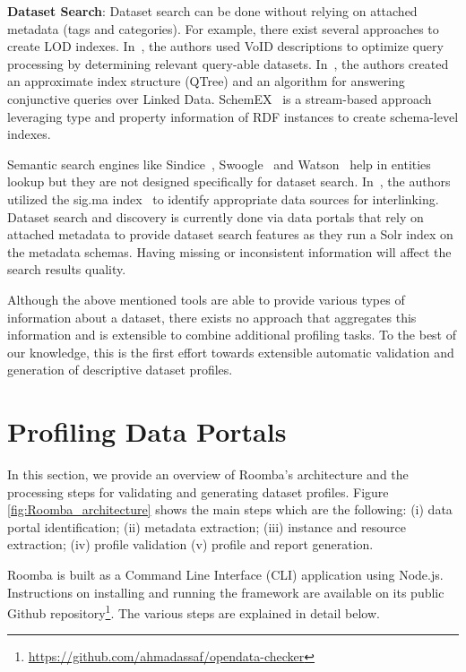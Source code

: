 \documentclass[runningheads,a4paper]{../../Util/LaTEX/llncs}
\begin{document}
\textbf{Dataset Search}: Dataset search can be done without relying on attached metadata (tags and categories). For example, there exist several approaches to create LOD indexes. In~\cite{Alexander:LDOW:09}, the authors used VoID descriptions to optimize query processing by determining relevant query-able datasets. In~\cite{Harth:WWW:10}, the authors created an approximate index structure (QTree) and an algorithm for answering conjunctive queries over Linked Data. SchemEX~\cite{Konrath:WebSemJorunal:12} is a stream-based approach leveraging type and property information of RDF instances to create schema-level indexes.

Semantic search engines like Sindice~\cite{Delbru:ESWC:10}, Swoogle~\cite{Ding:CIKM:04} and Watson~\cite{daquin:SemWebJorunal:11} help in entities lookup but they are not designed specifically for dataset search. In~\cite{Nikolov:JIST:11}, the authors utilized the sig.ma index~\cite{Tummarello:WebSemJorunal:10} to identify appropriate data sources for interlinking. Dataset search and discovery is currently done via data portals that rely on attached metadata to provide dataset search features as they run a Solr index on the metadata schemas. Having missing or inconsistent information will affect the search results quality.

Although the above mentioned tools are able to provide various types of information about a dataset, there exists no approach that aggregates this information and is extensible to combine additional profiling tasks. To the best of our knowledge, this is the first effort towards extensible automatic validation and generation of descriptive dataset profiles.


\section{Profiling Data Portals}
\label{sec:framework}
In this section, we provide an overview of Roomba's architecture and the processing steps for validating and generating dataset profiles. Figure \ref{fig:Roomba_architecture} shows the main steps which are the following: (i) data portal identification; (ii) metadata extraction; (iii) instance and resource extraction; (iv) profile validation (v) profile and report generation.

Roomba is built as a Command Line Interface (CLI) application using Node.js. Instructions on installing and running the framework are available on its public Github repository\footnote{\url{https://github.com/ahmadassaf/opendata-checker}}. The various steps are explained in detail below.
\end{document}
